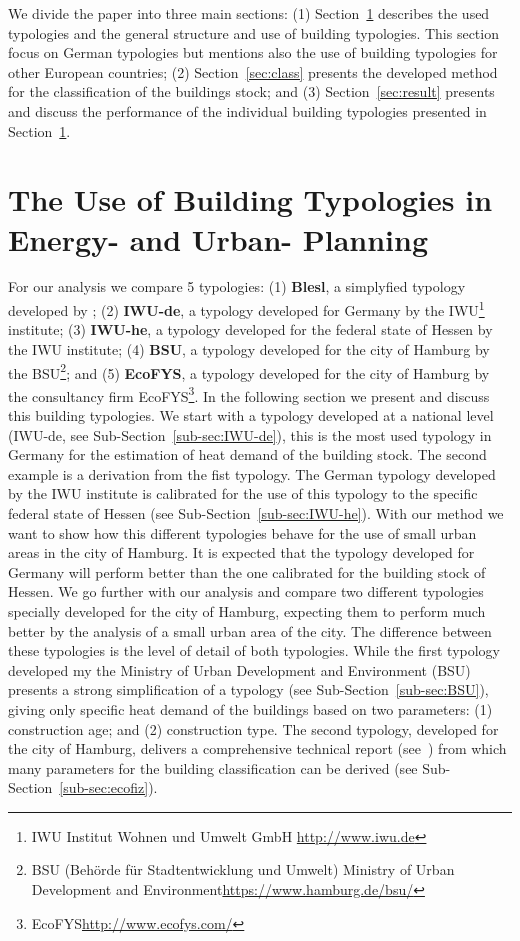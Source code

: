 \documentclass[authoryear,preprint,review,12pt]{elsarticle}
\begin{document}
\begin{linenumbers}
We divide the paper into three main sections: (1) Section~\ref{sec:Btype}
describes the used typologies and the general structure and use of building
typologies. This section focus on German typologies but mentions also the use
of building typologies for other European countries; (2)
Section~\ref{sec:class} presents the developed method for the classification of
the buildings stock; and (3) Section~\ref{sec:result} presents and discuss the
performance of the individual building typologies presented in
Section~\ref{sec:Btype}.\\

\section{The Use of Building Typologies in Energy- and Urban-
Planning}\label{sec:Btype}

For our analysis we compare 5 typologies:
(1) \textbf{Blesl}, a simplyfied typology developed by
\citeauthor{Blesl.2007};
(2) \textbf{IWU-de}, a typology developed for Germany by the IWU\footnote{IWU
    Institut Wohnen und Umwelt GmbH \url{http://www.iwu.de}} institute;
(3) \textbf{IWU-he}, a typology developed for the federal state of Hessen by
the IWU institute;
(4) \textbf{BSU}, a typology developed for the city of Hamburg by the
BSU\footnote{BSU (Behörde für Stadtentwicklung und Umwelt) Ministry of Urban
    Development and Environment\url{https://www.hamburg.de/bsu/}}; and
(5) \textbf{EcoFYS}, a typology developed for the city of Hamburg by the
consultancy firm EcoFYS\footnote{EcoFYS\url{http://www.ecofys.com/}}.
In the following section we present and discuss this building typologies. We
start with a typology developed at a national level (IWU-de, see
Sub-Section~\ref{sub-sec:IWU-de}), this is the most used typology in Germany
for the estimation of heat demand of the building stock.  The second example is
a derivation from the fist typology.  The German typology developed by the IWU
institute is calibrated for the use of this typology to the specific federal
state of Hessen (see Sub-Section~\ref{sub-sec:IWU-he}).  With our method we
want to show how this different typologies behave for the use of small urban
areas in the city of Hamburg.  It is expected that the typology developed for
Germany will perform better than the one calibrated for the building stock of
Hessen.  We go further with our analysis and compare two different typologies
specially developed for the city of Hamburg, expecting them to perform much
better by the analysis of a small urban area of the city.  The difference
between these typologies is the level of detail of both typologies.  While the
first typology developed my the Ministry of Urban Development and Environment
(BSU) presents a strong simplification of a typology (see
Sub-Section~\ref{sub-sec:BSU}), giving only specific heat demand of the
buildings based on two parameters:
(1) construction age; and
(2) construction type.
The second typology, developed for the city of Hamburg, delivers a
comprehensive technical report (see~\cite{Hermelink.2011}) from which many
parameters for the building classification can be derived (see
Sub-Section~\ref{sub-sec:ecofiz}).\\


\end{linenumbers}
\end{document}
